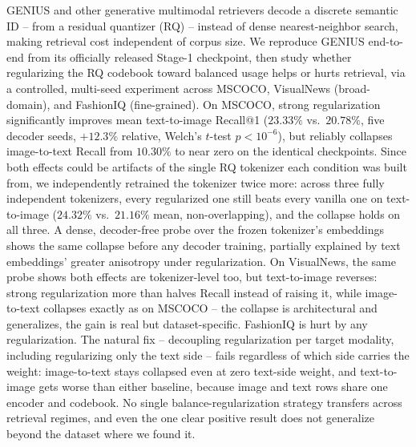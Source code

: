GENIUS and other generative multimodal retrievers decode a discrete semantic ID -- from a residual quantizer (RQ) -- instead of dense nearest-neighbor search, making retrieval cost independent of corpus size. We reproduce GENIUS end-to-end from its officially released Stage-1 checkpoint, then study whether regularizing the RQ codebook toward balanced usage helps or hurts retrieval, via a controlled, multi-seed experiment across MSCOCO, VisualNews (broad-domain), and FashionIQ (fine-grained). On MSCOCO, strong regularization significantly improves mean text-to-image Recall@1 ($23.33\%$ vs.\ $20.78\%$, five decoder seeds, $+12.3\%$ relative, Welch's $t$-test $p<10^{-6}$), but reliably collapses image-to-text Recall from $10.30\%$ to near zero on the identical checkpoints. Since both effects could be artifacts of the single RQ tokenizer each condition was built from, we independently retrained the tokenizer twice more: across three fully independent tokenizers, every regularized one still beats every vanilla one on text-to-image ($24.32\%$ vs.\ $21.16\%$ mean, non-overlapping), and the collapse holds on all three. A dense, decoder-free probe over the frozen tokenizer's embeddings shows the same collapse before any decoder training, partially explained by text embeddings' greater anisotropy under regularization. On VisualNews, the same probe shows both effects are tokenizer-level too, but text-to-image reverses: strong regularization more than halves Recall instead of raising it, while image-to-text collapses exactly as on MSCOCO -- the collapse is architectural and generalizes, the gain is real but dataset-specific. FashionIQ is hurt by any regularization. The natural fix -- decoupling regularization per target modality, including regularizing only the text side -- fails regardless of which side carries the weight: image-to-text stays collapsed even at zero text-side weight, and text-to-image gets worse than either baseline, because image and text rows share one encoder and codebook. No single balance-regularization strategy transfers across retrieval regimes, and even the one clear positive result does not generalize beyond the dataset where we found it.
